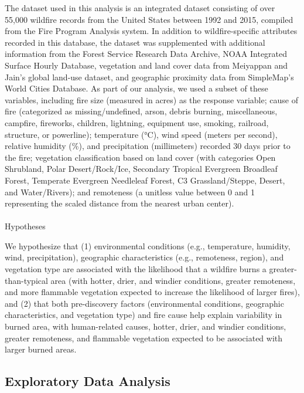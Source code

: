 \documentclass[
  letterpaper,
  DIV=11,
  numbers=noendperiod]{scrartcl}
\makeatletter
\let\oldparagraph\paragraph
\renewcommand{\paragraph}{
    \@ifstar
      \xxxParagraphStar
      \xxxParagraphNoStar
  }
\newcommand{\xxxParagraphStar}[1]{\oldparagraph*{#1}\mbox{}}
\newcommand{\xxxParagraphNoStar}[1]{\oldparagraph{#1}\mbox{}}
\makeatother
\begin{document}
The dataset used in this analysis is an integrated dataset consisting of
over 55,000 wildfire records from the United States between 1992 and
2015, compiled from the Fire Program Analysis system. In addition to
wildfire-specific attributes recorded in this database, the dataset was
supplemented with additional information from the Forest Service
Research Data Archive, NOAA Integrated Surface Hourly Database,
vegetation and land cover data from Meiyappan and Jain's global land-use
dataset, and geographic proximity data from SimpleMap's World Cities
Database. As part of our analysis, we used a subset of these variables,
including fire size (measured in acres) as the response variable; cause
of fire (categorized as missing/undefined, arson, debris burning,
miscellaneous, campfire, fireworks, children, lightning, equipment use,
smoking, railroad, structure, or powerline); temperature (°C), wind
speed (meters per second), relative humidity (\%), and precipitation
(millimeters) recorded 30 days prior to the fire; vegetation
classification based on land cover (with categories Open Shrubland,
Polar Desert/Rock/Ice, Secondary Tropical Evergreen Broadleaf Forest,
Temperate Evergreen Needleleaf Forest, C3 Grassland/Steppe, Desert, and
Water/Rivers); and remoteness (a unitless value between 0 and 1
representing the scaled distance from the nearest urban center).

\paragraph{Hypotheses}\label{hypotheses}

We hypothesize that (1) environmental conditions (e.g., temperature,
humidity, wind, precipitation), geographic characteristics (e.g.,
remoteness, region), and vegetation type are associated with the
likelihood that a wildfire burns a greater-than-typical area (with
hotter, drier, and windier conditions, greater remoteness, and more
flammable vegetation expected to increase the likelihood of larger
fires), and (2) that both pre-discovery factors (environmental
conditions, geographic characteristics, and vegetation type) and fire
cause help explain variability in burned area, with human-related
causes, hotter, drier, and windier conditions, greater remoteness, and
flammable vegetation expected to be associated with larger burned areas.

\subsection{Exploratory Data Analysis}\label{exploratory-data-analysis}
\end{document}
